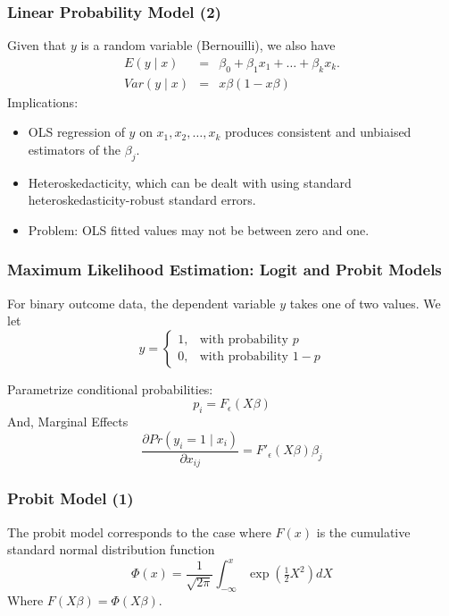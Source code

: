 \documentclass{beamer}
\newcommand{\1}{\mathbb{1}}
\begin{document}
\begin{frame}\frametitle{Linear Probability Model (2)}
Given that $y$ is a random variable (Bernouilli), we also have
\begin{eqnarray}
E(y \mid x) &=& \beta_0 + \beta_1 x_1+ \ldots + \beta_k x_k. \\
Var(y \mid x) &=& x\beta (1-x\beta) 
\end{eqnarray}
Implications:
\begin{itemize}
\item OLS regression of $y$ on $x_1, x_2, \ldots, x_k$ produces consistent and unbiaised estimators of the $\beta_j$.
\item Heteroskedacticity, which can be dealt with using standard heteroskedasticity-robust standard errors. 
\item Problem: OLS fitted values may not be between zero and one. 
\end{itemize}
\end{frame}

\begin{frame}\frametitle{Maximum Likelihood Estimation: Logit and Probit Models}
For binary outcome data, the dependent variable $y$ takes one of two values. We let 
\begin{equation}
y = \begin{cases} 1, & \mbox{with probability } p \\ 0, & \mbox{with probability } 1-p \end{cases}
\end{equation}

Parametrize conditional probabilities:
\begin{equation}
p_i = F_{\epsilon}(X\beta)
\end{equation}
And, Marginal Effects
\begin{equation}
\dfrac{\partial Pr(y_i=1 \mid x_i)}{\partial x_{ij}}  = F'_{\epsilon}(X\beta) \beta_j
\end{equation}
\end{frame}

\begin{frame}\frametitle{Probit Model (1)}
The probit model corresponds to the case where $F(x)$ is the cumulative standard normal distribution function 
\begin{equation}
\Phi(x) = \dfrac{1}{\sqrt{2\pi}} \int_{-\infty}^x \exp(\tfrac{1}{2}X^2) dX
\end{equation}
Where $F(X\beta) = \Phi(X\beta)$. 
\end{frame}
\end{document}
